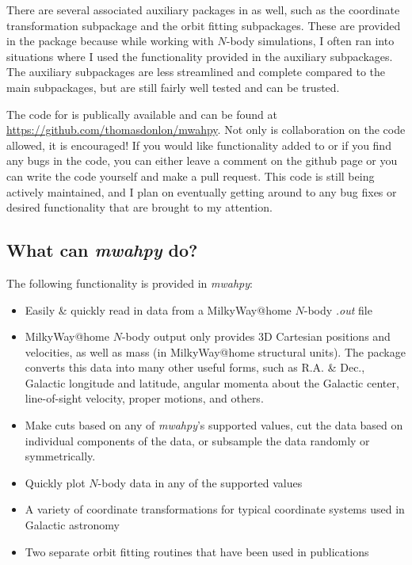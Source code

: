 \documentclass{article}
\begin{document}
There are several associated auxiliary packages in \mwahpy as well, such as the coordinate transformation subpackage and the orbit fitting subpackages. These are provided in the package because while working with $N$-body simulations, I often ran into situations where I used the functionality provided in the auxiliary subpackages. The auxiliary subpackages are less streamlined and complete compared to the main subpackages, but are still fairly well tested and can be trusted. 

The code for \mwahpy is publically available and can be found at \url{https://github.com/thomasdonlon/mwahpy}. Not only is collaboration on the code allowed, it is encouraged! If you would like functionality added to \mwahpy or if you find any bugs in the code, you can either leave a comment on the github page or you can write the code yourself and make a pull request. This code is still being actively maintained, and I plan on eventually getting around to any bug fixes or desired functionality that are brought to my attention. 

\subsection{What can \textit{mwahpy} do?}

The following functionality is provided in \textit{mwahpy}:

\begin{itemize}
\item Easily \& quickly read in data from a MilkyWay@home $N$-body \textit{.out} file
\item MilkyWay@home $N$-body output only provides 3D Cartesian positions and velocities, as well as mass (in MilkyWay@home structural units). The \mwahpy package converts this data into many other useful forms, such as R.A. \& Dec., Galactic longitude and latitude, angular momenta about the Galactic center, line-of-sight velocity, proper motions, and others. 
\item Make cuts based on any of \textit{mwahpy}'s supported values, cut the data based on individual components of the data, or subsample the data randomly or symmetrically. 
\item Quickly plot $N$-body data in any of the supported values
\item A variety of coordinate transformations for typical coordinate systems used in Galactic astronomy
\item Two separate orbit fitting routines that have been used in publications
\end{itemize}
\end{document}
